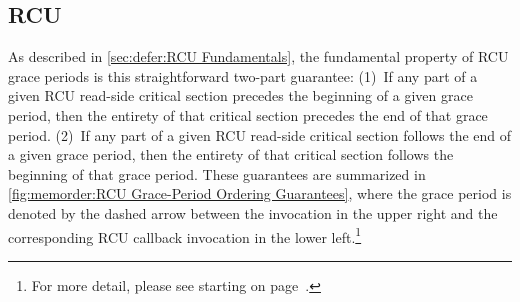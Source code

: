 





\subsection{RCU}
\label{sec:memorder:RCU}

As described in
\cref{sec:defer:RCU Fundamentals},
the fundamental property of RCU grace periods is this straightforward
two-part guarantee:
(1)~If any part of a given RCU read-side critical section precedes
the beginning of a given grace period, then the entirety of that
critical section precedes the end of that grace period.
(2)~If any part of a given RCU read-side critical section follows
the end of a given grace period, then the entirety of that
critical section follows the beginning of that grace period.
These guarantees are summarized in
\cref{fig:memorder:RCU Grace-Period Ordering Guarantees},
where the grace period is denoted by the dashed arrow between the
 invocation in the upper right and the corresponding
RCU callback invocation in the lower left.\footnote{
	For more detail, please see
	starting on
	page~\pageref{fig:defer:RCU Reader and Later Grace Period}.}

